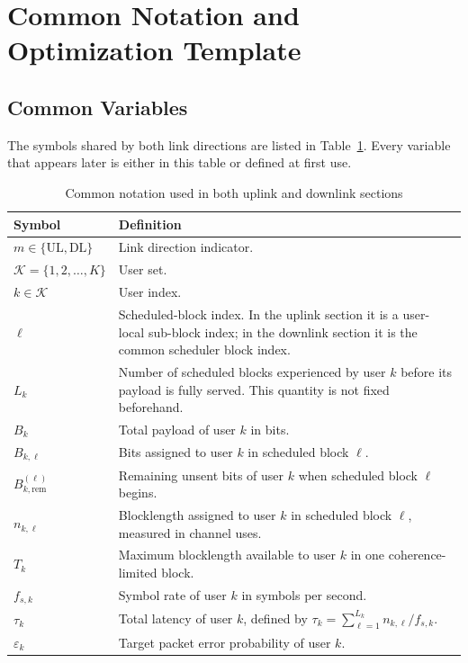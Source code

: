 \documentclass[11pt]{article}
\newcommand{\Kset}{\mathcal{K}}
\newcommand{\UL}{\mathrm{UL}}
\newcommand{\DL}{\mathrm{DL}}
\begin{document}
\section{Common Notation and Optimization Template}
\subsection{Common Variables}
The symbols shared by both link directions are listed in Table~\ref{tab:common-notation}. Every variable that appears later is either in this table or defined at first use.

\begin{table}[ht]
\centering
\small
\caption{Common notation used in both uplink and downlink sections}
\label{tab:common-notation}
\renewcommand{\arraystretch}{1.15}
\begin{tabularx}{\textwidth}{>{\raggedright\arraybackslash}p{} X}
\toprule
Symbol & Definition \\
\midrule
$m \in \{\UL,\DL\}$ & Link direction indicator. \\
$\Kset = \{1,2,\dots,K\}$ & User set. \\
$k \in \Kset$ & User index. \\
$\ell$ & Scheduled-block index. In the uplink section it is a user-local sub-block index; in the downlink section it is the common scheduler block index. \\
$L_k$ & Number of scheduled blocks experienced by user $k$ before its payload is fully served. This quantity is not fixed beforehand. \\
$B_k$ & Total payload of user $k$ in bits. \\
$B_{k,\ell}$ & Bits assigned to user $k$ in scheduled block $\ell$. \\
$B_{k,\mathrm{rem}}^{(\ell)}$ & Remaining unsent bits of user $k$ when scheduled block $\ell$ begins. \\
$n_{k,\ell}$ & Blocklength assigned to user $k$ in scheduled block $\ell$, measured in channel uses. \\
$T_k$ & Maximum blocklength available to user $k$ in one coherence-limited block. \\
$f_{s,k}$ & Symbol rate of user $k$ in symbols per second. \\
$\tau_k$ & Total latency of user $k$, defined by $\tau_k = \sum_{\ell=1}^{L_k} n_{k,\ell}/f_{s,k}$. \\
$\varepsilon_k$ & Target packet error probability of user $k$. \\

\end{tabularx}
\end{table}
\end{document}
